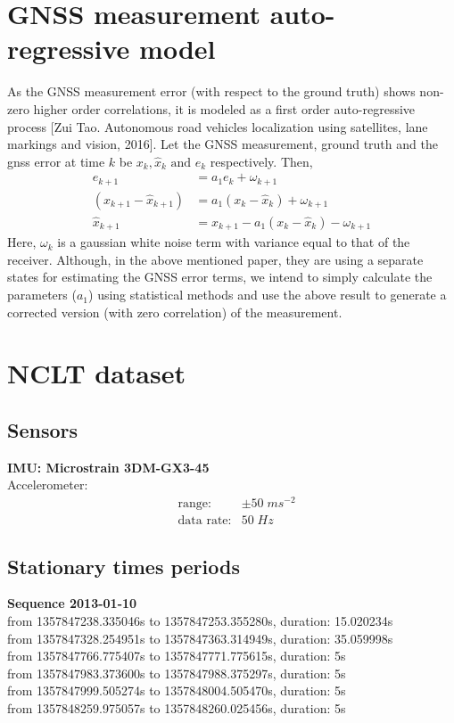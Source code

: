 \documentclass{article}
\begin{document}
\section{GNSS measurement auto-regressive model}
As the GNSS measurement error (with respect to the ground truth) shows non-zero higher order correlations, it is modeled as a first order auto-regressive process [Zui Tao. Autonomous road vehicles localization using satellites, lane markings and vision, 2016]. Let the GNSS measurement, ground truth and the gnss error at time $k$ be $x_k,\hat{x}_k \text{ and }e_k$ respectively. Then,
\begin{align}
    e_{k+1} &= a_1e_k + \omega_{k+1} \\
    (x_{k+1}-\hat{x}_{k+1}) &= a_1(x_k-\hat{x}_k) + \omega_{k+1} \\
    \hat{x}_{k+1} &= x_{k+1} - a_1(x_k-\hat{x}_k)-\omega_{k+1}
\end{align}
Here, $\omega_{k}$ is a gaussian white noise term with variance equal to that of the receiver. Although, in the above mentioned paper, they are using a separate states for estimating the GNSS error terms, we intend to simply calculate the parameters ($a_1$) using statistical methods and use the above result to generate a corrected version (with zero correlation) of the measurement. 




\section{NCLT dataset}
\subsection{Sensors}
{\bf IMU: Microstrain 3DM-GX3-45} \\
Accelerometer:
\begin{align}
    &\text{range}:& \pm 50 \; ms^{-2} \nonumber \\
    &\text{data rate}:& 50 \; Hz \nonumber
\end{align}


\subsection{Stationary times periods}
{\bf Sequence 2013-01-10}\\
from 1357847238.335046s to 1357847253.355280s, duration: 15.020234s \\
from 1357847328.254951s to 1357847363.314949s, duration: 35.059998s \\
from 1357847766.775407s to 1357847771.775615s, duration: 5s \\
from 1357847983.373600s to 1357847988.375297s, duration: 5s \\
from 1357847999.505274s to 1357848004.505470s, duration: 5s \\
from 1357848259.975057s to 1357848260.025456s, duration: 5s \\
\end{document}
